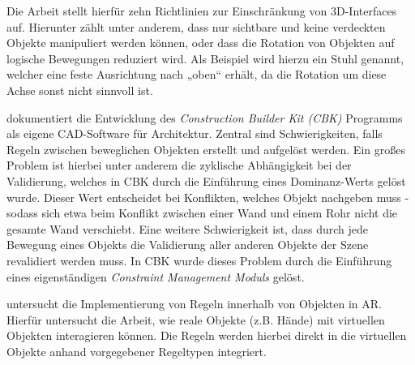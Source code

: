 Die Arbeit stellt hierfür zehn Richtlinien zur Einschränkung von 3D-Interfaces auf. Hierunter zählt unter anderem, dass nur sichtbare und keine verdeckten Objekte manipuliert werden können, oder dass die Rotation von Objekten auf logische Bewegungen reduziert wird. Als Beispiel wird hierzu ein Stuhl genannt, welcher eine feste Ausrichtung nach „oben“ erhält, da die Rotation um diese Achse sonst nicht sinnvoll ist.

\medskip



\textcite{grossElementsThatFollow1996} dokumentiert die Entwicklung des \textit{Construction Builder Kit (CBK)} Programms als eigene CAD-Software für Architektur.
Zentral sind Schwierigkeiten, falls Regeln zwischen beweglichen Objekten erstellt und aufgelöst werden. Ein großes Problem ist hierbei unter anderem die zyklische Abhängigkeit bei der Validierung, welches in CBK durch die Einführung eines Dominanz-Werts gelöst wurde. Dieser Wert entscheidet bei Konflikten, welches Objekt nachgeben muss - sodass sich etwa beim Konflikt zwischen einer Wand und einem Rohr nicht die gesamte Wand verschiebt.
Eine weitere Schwierigkeit ist, dass durch jede Bewegung eines Objekts die Validierung aller anderen Objekte der Szene revalidiert werden muss. In CBK wurde dieses Problem durch die Einführung eines eigenständigen \textit{Constraint Management Moduls} gelöst.

\medskip

\textcite{vassionInvestigatingConstrainedObjects2023a} untersucht die Implementierung von Regeln innerhalb von Objekten in AR. Hierfür untersucht die Arbeit, wie reale Objekte (z.B. Hände) mit virtuellen Objekten interagieren können. Die Regeln werden hierbei direkt in die virtuellen Objekte anhand vorgegebener Regeltypen integriert.

